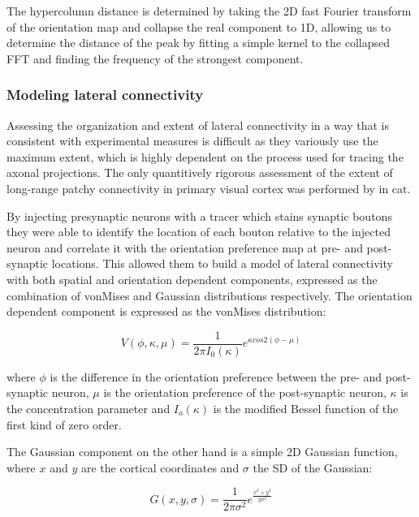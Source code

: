The hypercolumn distance is determined by taking the 2D fast Fourier
transform of the orientation map and collapse the real component to
1D, allowing us to determine the distance of the peak by fitting a
simple kernel to the collapsed FFT and finding the frequency of the
strongest component.

\subsubsection{Modeling lateral connectivity}

Assessing the organization and extent of lateral connectivity in a way
that is consistent with experimental measures is difficult as they
variously use the maximum extent, which is highly dependent on the
process used for tracing the axonal projections. The only quantitively
rigorous assessment of the extent of long-range patchy connectivity in
primary visual cortex was performed by \cite{Buzas2006} in cat.

By injecting presynaptic neurons with a tracer which stains synaptic
boutons they were able to identify the location of each bouton
relative to the injected neuron and correlate it with the orientation
preference map at pre- and post-synaptic locations. This allowed them
to build a model of lateral connectivity with both spatial and
orientation dependent components, expressed as the combination of
vonMises and Gaussian distributions respectively. The orientation
dependent component is expressed as the vonMises distribution:

\begin{equation}
V(\phi, \kappa, \mu) = \frac{1}{2 \pi I_0(\kappa)} e^{\kappa cos 2(\phi - \mu)}
\end{equation}

where $\phi$ is the difference in the orientation preference between
the pre- and post-synaptic neuron, $\mu$ is the orientation preference
of the post-synaptic neuron, $\kappa$ is the concentration parameter
and $I_o(\kappa)$ is the modified Bessel function of the first kind of
zero order.

The Gaussian component on the other hand is a simple 2D Gaussian
function, where $x$ and $y$ are the cortical coordinates and $\sigma$
the SD of the Gaussian:

\begin{equation}
G(x, y, \sigma) = \frac{1}{2 \pi \sigma^2} e^{\frac{x^2+y^2}{2
    \sigma^2}}
\end{equation}

